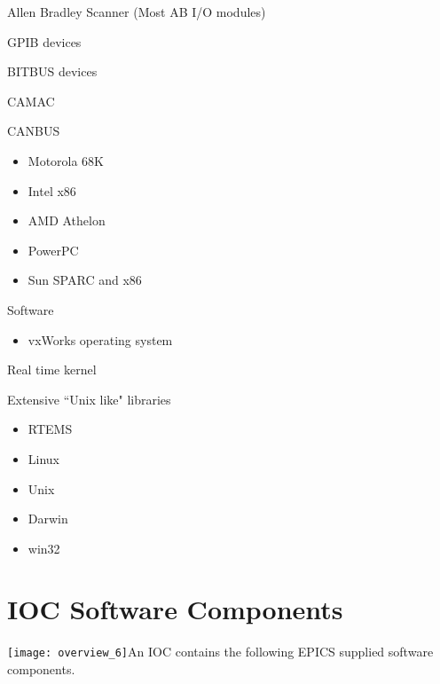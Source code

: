 Allen Bradley Scanner (Most AB I/O modules)

GPIB devices

BITBUS devices

CAMAC

CANBUS

\begin{itemize}\item Motorola 68K

\item Intel x86

\item AMD Athelon

\item PowerPC

\item Sun SPARC and x86

\end{itemize}Software

\begin{itemize}\item vxWorks operating system

\end{itemize}Real time kernel

Extensive ``Unix like" libraries

\begin{itemize}\item RTEMS

\item Linux

\item Unix

\item Darwin

\item win32

\end{itemize}\section{IOC Software Components}


\texttt{[image: overview\_6]}An IOC contains the following EPICS supplied software components.

